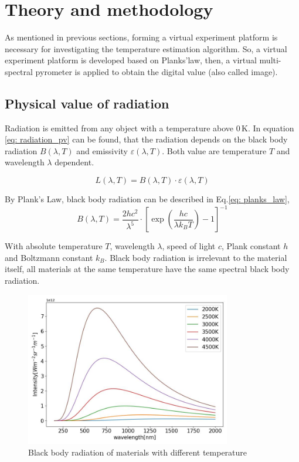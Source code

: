 \chapter{Theory and methodology}%
As mentioned in previous sections, forming a virtual experiment platform 
is necessary for investigating the temperature estimation algorithm. So, a virtual 
experiment platform is developed based on Planks'law, then, a virtual multi-spectral 
pyrometer is applied to obtain the digital value (also called image). 


\section{Physical value of radiation}%
Radiation is emitted from any object with a temperature above $0 \, \text{K}$. In equation \ref{eq: radiation_pv}
can be found, that the radiation depends on the black body radiation $B(\lambda, T)$ 
and emissivity $\varepsilon(\lambda, T)$. Both value are temperature $T$ and wavelength $\lambda$ 
dependent.

\begin{equation}
    \label{eq: radiation_pv}
    L(\lambda, T) = B(\lambda, T) \cdot \varepsilon (\lambda, T)
\end{equation}


By Plank's Law, black body radiation can be described in Eq.\ref{eq: planks_law}, 
\begin{equation}
    \label{eq: planks_law}
    B(\lambda, T) = \frac{{2hc^2}}{{\lambda^5}} \cdot {\left[{\exp\left(\frac{{hc}}{{\lambda k_B T}}\right) - 1}\right]}^{-1}
\end{equation}

With absolute temperature $T$, wavelength $\lambda$, speed of light $c$, Plank 
constant $h$ and Boltzmann constant $k_B$. Black body radiation is irrelevant 
to the material itself, all materials at the same temperature have the same spectral 
black body radiation.

\begin{figure}[htbp]
    \centering
    \includegraphics[width=0.8\textwidth]{figures/wiens_law.jpg}
    \caption{Black body radiation of materials with different temperature}
    \label{fig: wiens_law}
\end{figure}

